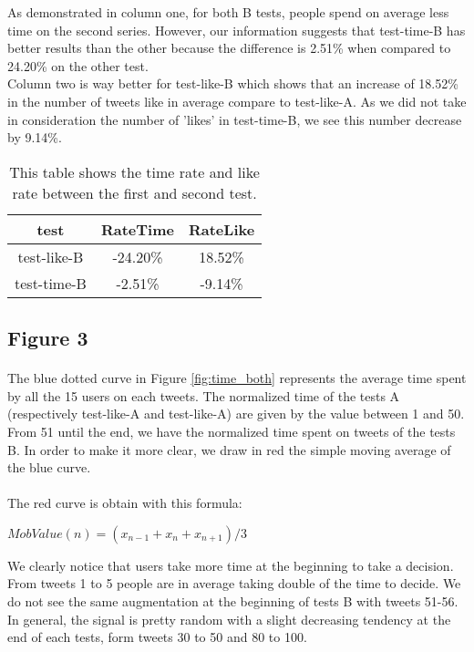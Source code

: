 As demonstrated in column one, for both B tests, people spend on average less time on the second series. However, our information suggests that test-time-B has better results than the other because the difference is 2.51\% when compared to 24.20\% on the other test. \\
Column two is way better for test-like-B which shows that an increase of 18.52\% in the number of tweets like in average compare to test-like-A. As we did not take in consideration the number of 'likes' in test-time-B, we see this number decrease by 9.14\%.

\begin{table}[h]
\centering
\begin{tabular}{ccc}
\toprule
test & RateTime & RateLike \\ 
\midrule
test-like-B & -24.20\% & 18.52\% \\
test-time-B & -2.51\% & -9.14\% \\
\bottomrule 
\end{tabular}
\caption[rate time \& likes]{This table shows the time rate and like rate between the first and second test.}
\label{tab:mo_problem}
\end{table}

\subsection{Figure 3}

\paragraph{}
The blue dotted curve in Figure \ref{fig:time_both} represents the average time spent by all the 15 users on each tweets. The normalized time of the tests A (respectively test-like-A and test-like-A) are given by the value between 1 and 50. From 51 until the end, we have the normalized time spent on tweets of the tests B.
In order to make it more clear, we draw in red the simple moving average of the blue curve. \\ \\
The red curve is obtain with this formula:

\begin{center}
$MobValue(n)={(x_{n-1}+x_{n}+x_{n+1})}/3$
\end{center}


We clearly notice that users take more time at the beginning to take a decision. From tweets 1 to 5 people are in average taking double of the time to decide. We do not see  the same augmentation at the beginning of tests B with tweets 51-56.\\
In general, the signal is pretty random with a slight decreasing tendency at the end of each tests, form tweets 30 to 50 and 80 to 100.

